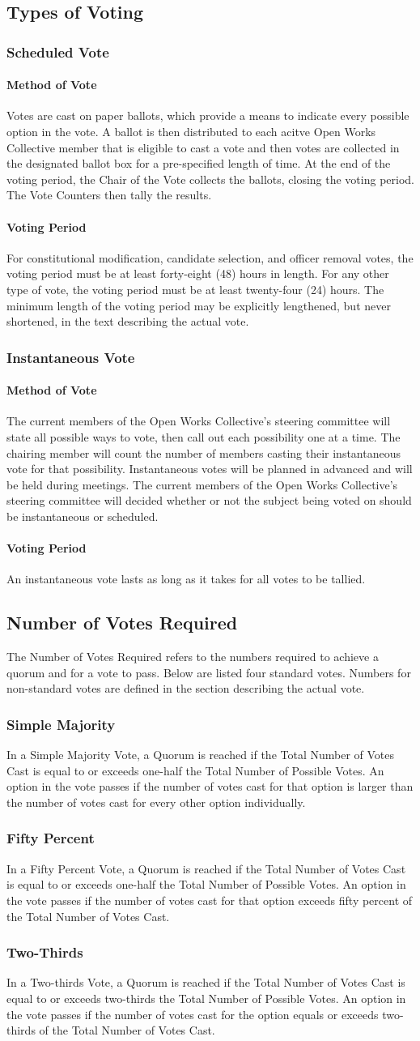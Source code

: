 \documentclass{article}
\newcommand{\asection}[1]{\subsection{#1} \label{#1}}
\newcommand{\asubsection}[1]{\subsubsection{#1} \label{#1}}
\newcommand{\asubsubsection}[1]{\paragraph{#1} \label{#1}}
\begin{document}
\asection{Types of Voting}

\asubsection{Scheduled Vote}
\asubsubsection{Method of Vote}
Votes are cast on paper ballots, which provide a means to indicate every possible option in the vote.
A ballot is then distributed to each acitve Open Works Collective member that is eligible to cast a vote and then votes are collected in the designated ballot box for a pre-specified length of time.
At the end of the voting period, the Chair of the Vote collects the ballots, closing the voting period.
The Vote Counters then tally the results.

\asubsubsection{Voting Period}
For constitutional modification, candidate selection, and officer removal votes, the voting period must be at least forty-eight (48) hours in length.
For any other type of vote, the voting period must be at least twenty-four (24) hours.
The minimum length of the voting period may be explicitly lengthened, but never shortened, in the text describing the actual vote.
\asubsection{Instantaneous Vote}
\asubsubsection{Method of Vote}
The current members of the Open Works Collective's steering committee will state all possible ways to vote, then call out each possibility one at a time.
The chairing member will count the number of members casting their instantaneous vote for that possibility. Instantaneous votes will be planned in advanced and will be held during meetings. The current members of the Open Works Collective's steering committee will decided whether or not the subject being voted on should be instantaneous or scheduled.
\asubsubsection{Voting Period}
An instantaneous vote lasts as long as it takes for all votes to be tallied.

\asection{Number of Votes Required}
The Number of Votes Required refers to the numbers required to achieve a quorum and for a vote to pass.
Below are listed four standard votes.
Numbers for non-standard votes are defined in the section describing the actual vote.
\asubsection{Simple Majority}
In a Simple Majority Vote, a Quorum is reached if the Total Number of Votes Cast is equal to or exceeds one-half the Total Number of Possible Votes.
An option in the vote passes if the number of votes cast for that option is larger than the number of votes cast for every other option individually.
\asubsection{Fifty Percent}
In a Fifty Percent Vote, a Quorum is reached if the Total Number of Votes Cast is equal to or exceeds one-half the Total Number of Possible Votes.
An option in the vote passes if the number of votes cast for that option exceeds fifty percent of the Total Number of Votes Cast.
\asubsection{Two-Thirds}
In a Two-thirds Vote, a Quorum is reached if the Total Number of Votes Cast is equal to or exceeds two-thirds the Total Number of Possible Votes.
An option in the vote passes if the number of votes cast for the option equals or exceeds two-thirds of the Total Number of Votes Cast.
\end{document}
